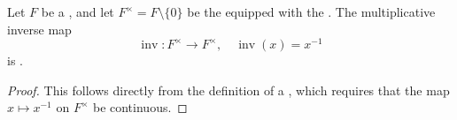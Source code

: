 \begin{proposition} \label{proposition:multiplicative_inverse_in_topological_field_is_continuous}
    Let $F$ be a , and let $F^\times = F \setminus \{0\}$ be the  equipped with the . The multiplicative inverse map
    $$\operatorname{inv} : F^\times \to F^\times, \quad \operatorname{inv}(x) = x^{-1}$$
    is .
\end{proposition}
\begin{proof}
    This follows directly from the definition of a , which requires that the map $x \mapsto x^{-1}$ on $F^\times$ be continuous.
\end{proof}
